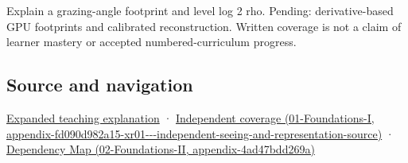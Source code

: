 Explain a grazing-angle footprint and level log 2 rho. Pending: derivative-based GPU footprints and calibrated reconstruction. Written coverage is not a claim of learner mastery or accepted numbered-curriculum progress.

\subsection{Source and navigation}\label{appendix-b677a85ba76f-source-and-navigation}

\hyperref[04-visual-computing-ii-ch042-multiresolution-work-must-preserve-the-right-information]{Expanded teaching explanation} · \href{../01-Foundations-I/main.pdf\#nameddest=appendix-fd090d982a15-xr01---independent-seeing-and-representation-source}{Independent coverage (01-Foundations-I, appendix-fd090d982a15-xr01-\/-\/-independent-seeing-and-representation-source)} · \href{../02-Foundations-II/main.pdf\#nameddest=appendix-4ad47bdd269a}{Dependency Map (02-Foundations-II, appendix-4ad47bdd269a)}
